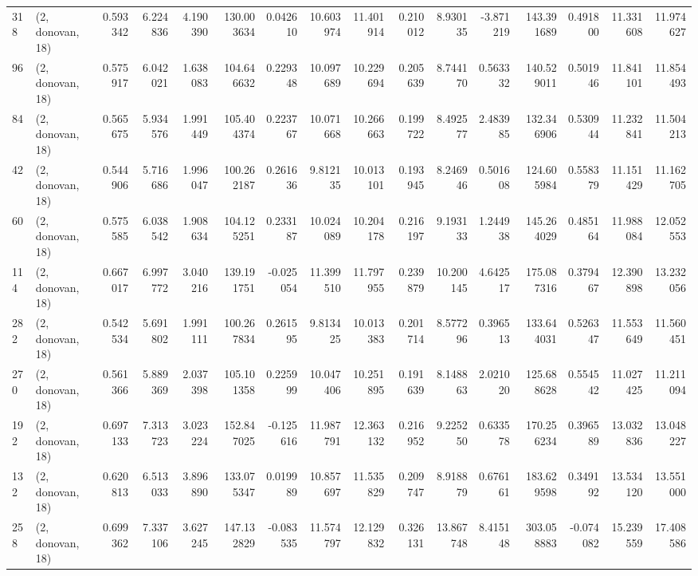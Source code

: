 \begin{tabular}{llrrrrrrrrrrrrrr}
318 &  (2, donovan, 18) &   0.593342 &   6.224836 &   4.190390 &   130.003634 &   0.042610 &  10.603974 &  11.401914 &  0.210012 &   8.930135 &  -3.871219 &   143.391689 &   0.491800 &  11.331608 &  11.974627 \\
96  &  (2, donovan, 18) &   0.575917 &   6.042021 &   1.638083 &   104.646632 &   0.229348 &  10.097689 &  10.229694 &  0.205639 &   8.744170 &   0.563332 &   140.529011 &   0.501946 &  11.841101 &  11.854493 \\
84  &  (2, donovan, 18) &   0.565675 &   5.934576 &   1.991449 &   105.404374 &   0.223767 &  10.071668 &  10.266663 &  0.199722 &   8.492577 &   2.483985 &   132.346906 &   0.530944 &  11.232841 &  11.504213 \\
42  &  (2, donovan, 18) &   0.544906 &   5.716686 &   1.996047 &   100.262187 &   0.261636 &   9.812135 &  10.013101 &  0.193945 &   8.246946 &   0.501608 &   124.605984 &   0.558379 &  11.151429 &  11.162705 \\
60  &  (2, donovan, 18) &   0.575585 &   6.038542 &   1.908634 &   104.125251 &   0.233187 &  10.024089 &  10.204178 &  0.216197 &   9.193133 &   1.244938 &   145.264029 &   0.485164 &  11.988084 &  12.052553 \\
114 &  (2, donovan, 18) &   0.667017 &   6.997772 &   3.040216 &   139.191751 &  -0.025054 &  11.399510 &  11.797955 &  0.239879 &  10.200145 &   4.642517 &   175.087316 &   0.379467 &  12.390898 &  13.232056 \\
282 &  (2, donovan, 18) &   0.542534 &   5.691802 &   1.991111 &   100.267834 &   0.261595 &   9.813425 &  10.013383 &  0.201714 &   8.577296 &   0.396513 &   133.644031 &   0.526347 &  11.553649 &  11.560451 \\
270 &  (2, donovan, 18) &   0.561366 &   5.889369 &   2.037398 &   105.101358 &   0.225999 &  10.047406 &  10.251895 &  0.191639 &   8.148863 &   2.021020 &   125.688628 &   0.554542 &  11.027425 &  11.211094 \\
192 &  (2, donovan, 18) &   0.697133 &   7.313723 &   3.023224 &   152.847025 &  -0.125616 &  11.987791 &  12.363132 &  0.216952 &   9.225250 &   0.633578 &   170.256234 &   0.396589 &  13.032836 &  13.048227 \\
132 &  (2, donovan, 18) &   0.620813 &   6.513033 &   3.896890 &   133.075347 &   0.019989 &  10.857697 &  11.535829 &  0.209747 &   8.918879 &   0.676161 &   183.629598 &   0.349192 &  13.534120 &  13.551000 \\
258 &  (2, donovan, 18) &   0.699362 &   7.337106 &   3.627245 &   147.132829 &  -0.083535 &  11.574797 &  12.129832 &  0.326131 &  13.867748 &   8.415148 &   303.058883 &  -0.074082 &  15.239559 &  17.408586 \\

\end{tabular}
